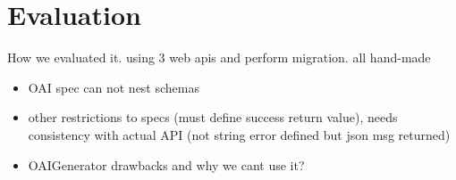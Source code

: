 \section{Evaluation}
\label{sec:Evaluation}

How we evaluated it. using 3 web apis and perform migration. all hand-made


\begin{itemize}
	\item OAI spec can not nest schemas
	\item other restrictions to specs (must define success return value), needs consistency with actual API (not string error defined but json msg returned)
	\item OAIGenerator drawbacks and why we cant use it?
\end{itemize}